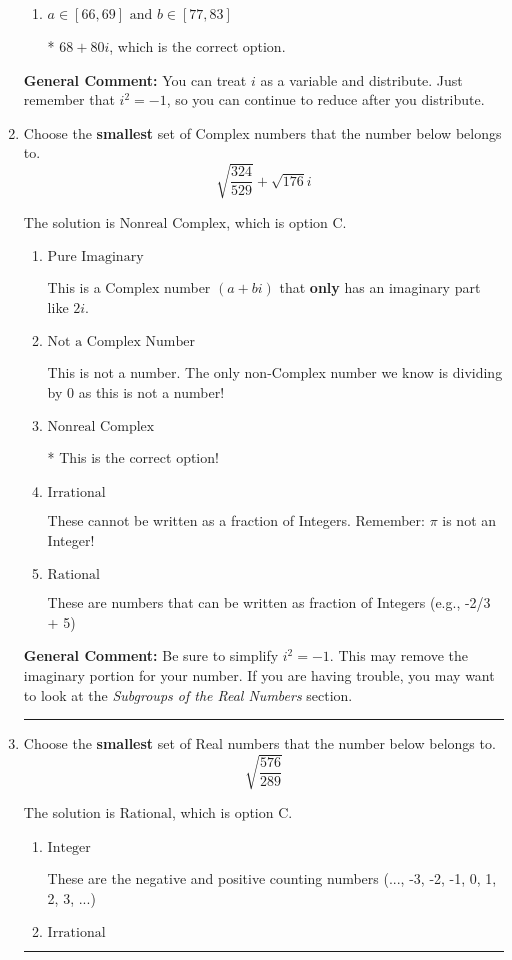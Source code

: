 \documentclass{extbook}[14pt]
\newcommand{\litem}[1]{\item #1

\rule{\textwidth}{0.4pt}}
\begin{document}
\begin{enumerate}
{\begin{enumerate}[label=\Alph*.]
 $50 - 18 i$, which corresponds to just multiplying the real terms to get the real part of the solution and the coefficients in the complex terms to get the complex part.
\item \( a \in [66, 69] \text{ and } b \in [77, 83] \)

* $68 + 80 i$, which is the correct option.
\end{enumerate}

\textbf{General Comment:} You can treat $i$ as a variable and distribute. Just remember that $i^2=-1$, so you can continue to reduce after you distribute.
}
\litem{
Choose the \textbf{smallest} set of Complex numbers that the number below belongs to.
\[ \sqrt{\frac{324}{529}}+\sqrt{176} i \]

The solution is \( \text{Nonreal Complex} \), which is option C.\begin{enumerate}[label=\Alph*.]
\item \( \text{Pure Imaginary} \)

This is a Complex number $(a+bi)$ that \textbf{only} has an imaginary part like $2i$.
\item \( \text{Not a Complex Number} \)

This is not a number. The only non-Complex number we know is dividing by 0 as this is not a number!
\item \( \text{Nonreal Complex} \)

* This is the correct option!
\item \( \text{Irrational} \)

These cannot be written as a fraction of Integers. Remember: $\pi$ is not an Integer!
\item \( \text{Rational} \)

These are numbers that can be written as fraction of Integers (e.g., -2/3 + 5)
\end{enumerate}

\textbf{General Comment:} Be sure to simplify $i^2 = -1$. This may remove the imaginary portion for your number. If you are having trouble, you may want to look at the \textit{Subgroups of the Real Numbers} section.
}
\litem{
Choose the \textbf{smallest} set of Real numbers that the number below belongs to.
\[ \sqrt{\frac{576}{289}} \]

The solution is \( \text{Rational} \), which is option C.\begin{enumerate}[label=\Alph*.]
\item \( \text{Integer} \)

These are the negative and positive counting numbers (..., -3, -2, -1, 0, 1, 2, 3, ...)
\item \( \text{Irrational} \)


\end{enumerate}}
\end{enumerate}
\end{document}
